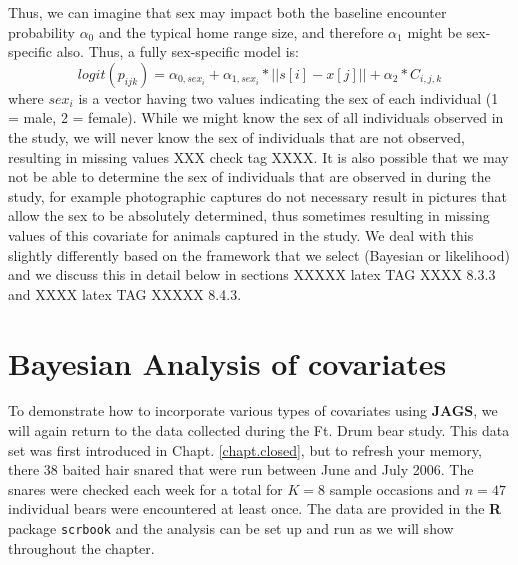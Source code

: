 Thus, we can imagine that sex may impact both the baseline encounter
probability $\alpha_{0}$ and the typical home range
size, and therefore  
$\alpha_{1}$ might be sex-specific also.  Thus, a fully sex-specific model is:
\[
logit(p_{ijk}) = \alpha_{0,sex_{i}} + \alpha_{1, sex_{i}}*||s[i]-x[j]|| + \alpha_2*C_{i,j,k}
\]
where $sex_{i}$ is a vector  having two values indicating the sex of
each individual (1 = male, 2 = female).  While we might know the sex of all
individuals observed in the study, we will never know the
sex of individuals that are not observed, 
resulting in missing values \citep{gardner_etal:2010jwm} XXX check tag XXXX. 
It is also possible that we may not be able to determine the sex of 
individuals that are observed in during the study, for example photographic 
captures do not necessary result in pictures that allow the sex to be absolutely
determined, thus sometimes resulting in missing values of this covariate for animals
captured in the study.   We deal with this slightly differently based on the framework
that we select (Bayesian or likelihood) and we discuss this in detail
below in sections XXXXX latex TAG XXXX 8.3.3 and XXXX latex TAG XXXXX 8.4.3.

\begin{comment}
XXX whole section on this below so commented out here XXXXX
\subsection{Heterogeneity} 

Heterogeneity is a covariate that is completely latent.  This can
include many things such as an additive individual effect or an
individual-specific effect of distance.  We address these models
separately in Section 8.5 below and show a simple example of a finite
mixture model carried out in secr in Section 8.4.4.
\end{comment}

\section{Bayesian Analysis of covariates}

To demonstrate how to incorporate various types of covariates using
{\bf JAGS}, we will again return to the data collected during the
Ft. Drum bear study.  This data set was first introduced in Chapt. \ref{chapt.closed},
but to refresh your memory, there 38 baited hair snared that were run
between June and July 2006.  The snares were checked each week for a
total for $K=8$ sample occasions and $n=47$ individual bears were
encountered at least once.  The data are provided in the {\bf R}
package \mbox{\tt scrbook} and the analysis can be set up and run as
we will show throughout the chapter.

